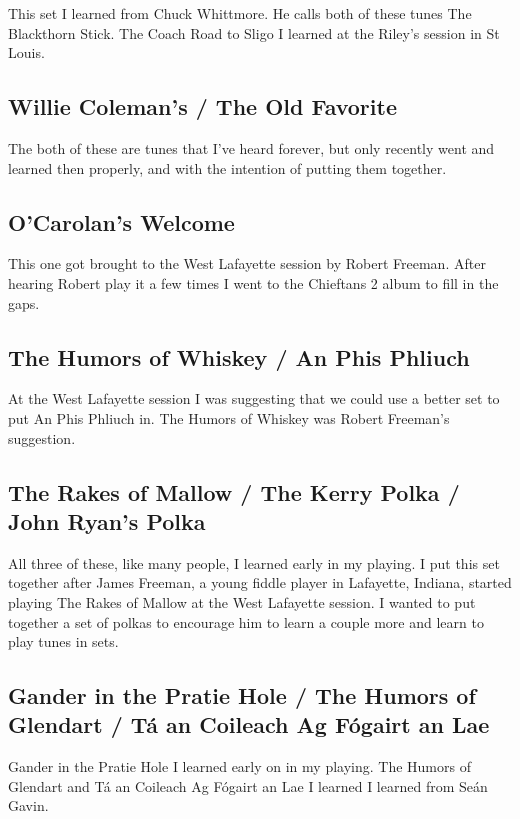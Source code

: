 \documentclass[11pt,letterpaper]{article}
\begin{document}
{This set I learned from Chuck Whittmore. He calls both of these tunes The Blackthorn Stick. The Coach Road to Sligo I learned at the Riley's session in St Louis.

\subsection{Willie Coleman's / The Old Favorite}

The  both of these are tunes that I've heard forever, but only recently went and learned then properly, and with the intention of putting them together.

\subsection{O'Carolan's Welcome}

This one got brought to the West Lafayette session by Robert Freeman. After hearing Robert play it a few times I went to the Chieftans 2 album to fill in the gaps.

\subsection{The Humors of Whiskey / An Phis Phliuch}

At the West Lafayette session I was suggesting that we could use a better set to put An Phis Phliuch in. The Humors of Whiskey was Robert Freeman's suggestion. 

\subsection{The Rakes of Mallow / The Kerry Polka / John Ryan's Polka}

All three of these, like many people, I learned early in my playing. I put this set together after James Freeman, a young fiddle player in Lafayette, Indiana, started playing The Rakes of Mallow at the West Lafayette session. I wanted to put together a set of polkas to encourage him to learn a couple more and learn to play tunes in sets.

\subsection{Gander in the Pratie Hole / The Humors of Glendart / Tá an Coileach Ag Fógairt an Lae}

Gander in the Pratie Hole I learned early on in my playing. The Humors of Glendart and Tá an Coileach Ag Fógairt an Lae I learned I learned from Seán Gavin.

}
\end{document}
